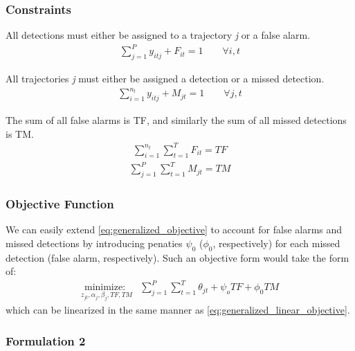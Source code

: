 \documentclass[journal]{IEEEtran}
\begin{document}
\subsubsection{Constraints}

All detections must either be assigned to a trajectory \textit{j} or a false alarm. 
\begin{align}\label{eqn: FA Simple}
\sum_{j=1}^{P} y_{itj} + F_{it} = 1 \qquad \forall i,t
\end{align}

All trajectories \textit{j} must either be assigned a detection or a missed detection. 
\begin{align}
\sum_{i=1}^{n_{t}} y_{itj} + M_{jt} = 1 \qquad \forall j,t
\end{align}

The sum of all false alarms is TF, and similarly the sum of all missed detections is TM. 
\begin{align}
\sum_{i=1}^{n_{t}} \sum_{t=1}^{T} F_{it} = TF
\end{align}
\begin{align}\label{eqn: MD Total}
\sum_{j=1}^{P} \sum_{t=1}^{T} M_{jt} = TM 
\end{align}

\subsubsection{Objective Function}
We can easily extend \eqref{eq:generalized_objective} to account for false alarms and missed detections by introducing penaties $\psi_{0}$ ($\phi_{0}$, respectively) for each missed detection (false alarm, respectively). Such an objective form would take the form of:
\begin{align}
\underset{z_{jt}, \alpha_{j}, \beta_{j},TF,TM}{\text{minimize: }} & \sum_{j=1}^{P} \sum_{t=1}^{T} \theta_{jt} + \psi_{o} TF + \phi_{0} TM
\end{align}
which can be linearized in the same manner as \eqref{eq:generalized_linear_objective}.

\subsubsection{Formulation 2}
\end{document}
